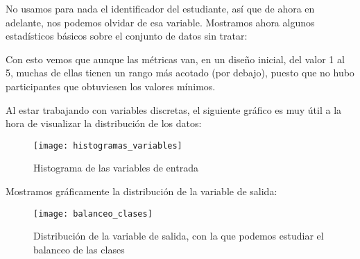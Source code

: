 No usamos para nada el identificador del estudiante, así que de ahora en adelante, nos podemos olvidar de esa variable. Mostramos ahora algunos estadísticos básicos sobre el conjunto de datos sin tratar:

\begin{table}[H]
\caption{Resumen del conjunto de datos original}
\end{table}

Con esto vemos que aunque las métricas van, en un diseño inicial, del valor 1 al 5, muchas de ellas tienen un rango más acotado (por debajo), puesto que no hubo participantes que obtuviesen los valores mínimos.

Al estar trabajando con variables discretas, el siguiente gráfico es muy útil a la hora de visualizar la distribución de los datos:

\begin{figure}[H]
    \centering
    \texttt{[image: histogramas\_variables]}
    \caption{Histograma de las variables de entrada}
\end{figure}

Mostramos gráficamente la distribución de la variable de salida:

\begin{figure}[H]
    \centering
    \texttt{[image: balanceo\_clases]}
    \caption{Distribución de la variable de salida, con la que podemos estudiar el balanceo de las clases}
\end{figure}



